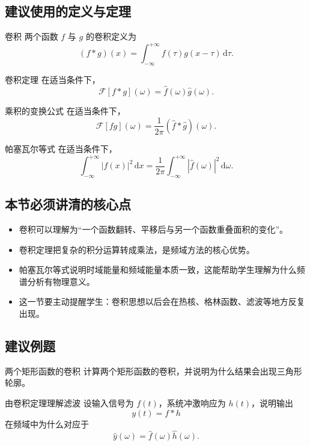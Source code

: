\subsection*{建议使用的定义与定理}
\begin{dingliyi}{卷积}{}
两个函数 $f$ 与 $g$ 的卷积定义为
\[
    (f*g)(x)=\int_{-\infty}^{+\infty} f(\tau)g(x-\tau)\,\mathrm{d}\tau.
\]
\end{dingliyi}

\begin{dingli}{卷积定理}{}
在适当条件下，
\[
    \mathcal{F}[f*g](\omega)=\hat{f}(\omega)\hat{g}(\omega).
\]
\end{dingli}

\begin{dingli}{乘积的变换公式}{}
在适当条件下，
\[
    \mathcal{F}[f g](\omega)=\frac{1}{2\pi}(\hat{f}*\hat{g})(\omega).
\]
\end{dingli}

\begin{dingli}{帕塞瓦尔等式}{}
在适当条件下，
\[
    \int_{-\infty}^{+\infty} |f(x)|^2\,\mathrm{d}x
    =
    \frac{1}{2\pi}\int_{-\infty}^{+\infty} |\hat{f}(\omega)|^2\,\mathrm{d}\omega.
\]
\end{dingli}

\subsection*{本节必须讲清的核心点}
\begin{itemize}
    \item 卷积可以理解为``一个函数翻转、平移后与另一个函数重叠面积的变化''。
    \item 卷积定理把复杂的积分运算转成乘法，是频域方法的核心优势。
    \item 帕塞瓦尔等式说明时域能量和频域能量本质一致，这能帮助学生理解为什么频谱分析有物理意义。
    \item 这一节要主动提醒学生：卷积思想以后会在热核、格林函数、滤波等地方反复出现。
\end{itemize}

\subsection*{建议例题}
\begin{lizi}{两个矩形函数的卷积}{}
计算两个矩形函数的卷积，并说明为什么结果会出现三角形轮廓。
\end{lizi}

\begin{lizi}{由卷积定理理解滤波}{}
设输入信号为 $f(t)$，系统冲激响应为 $h(t)$，说明输出
\[
    y(t)=f*h
\]
在频域中为什么对应于
\[
    \hat{y}(\omega)=\hat{f}(\omega)\hat{h}(\omega).
\]
\end{lizi}

